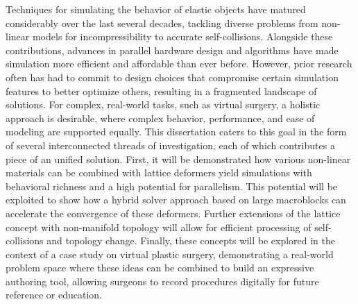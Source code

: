 
Techniques for simulating the behavior of elastic objects have matured
considerably over the last several decades, tackling diverse problems
from non-linear models for incompressibility to accurate
self-collisions. Alongside these contributions, advances in parallel
hardware design and algorithms have made simulation more efficient and
affordable than ever before. However, prior research often has had to
commit to design choices that compromise certain simulation features
to better optimize others, resulting in a fragmented landscape of
solutions. For complex, real-world tasks, such as virtual surgery, a
holistic approach is desirable, where complex behavior, performance,
and ease of modeling are supported equally. This dissertation caters
to this goal in the form of several interconnected threads of
investigation, each of which contributes a piece of an unified
solution. First, it will be demonstrated how various non-linear
materials can be combined with lattice deformers yield simulations
with behavioral richness and a high potential for parallelism. This
potential will be exploited to show how a hybrid solver approach based
on large macroblocks can accelerate the convergence of these
deformers. Further extensions of the lattice concept with non-manifold
topology will allow for efficient processing of self-collisions and
topology change. Finally, these concepts will be explored in the
context of a case study on virtual plastic surgery, demonstrating a
real-world problem space where these ideas can be combined to build an
expressive authoring tool, allowing surgeons to record procedures
digitally for future reference or education.


